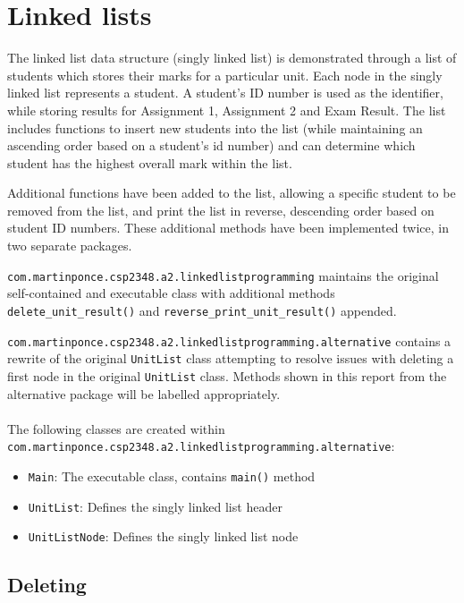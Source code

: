 \newpage
\section{Linked lists}

The linked list data structure (singly linked list) is demonstrated through a list of students which stores their marks for a particular unit. Each node in the singly linked list represents a student. A student's ID number is used as the identifier, while storing results for Assignment 1, Assignment 2 and Exam Result. The list includes functions to insert new students into the list (while maintaining an ascending order based on a student's id number) and can determine which student has the highest overall mark within the list.

Additional functions have been added to the list, allowing a specific student to be removed from the list, and print the list in reverse, descending order based on student ID numbers. These additional methods have been implemented twice, in two separate packages.

\texttt{com.martinponce.csp2348.a2.linkedlistprogramming} maintains the original self-contained and executable class with additional methods \texttt{delete_unit_result()} and \texttt{reverse_print_unit_result()} appended.

\texttt{com.martinponce.csp2348.a2.linkedlistprogramming.alternative} contains a rewrite of the original \texttt{UnitList} class attempting to resolve issues with deleting a first node in the original \texttt{UnitList} class. Methods shown in this report from the alternative package will be labelled appropriately.
\\
\\
The following classes are created within \\
\texttt{com.martinponce.csp2348.a2.linkedlistprogramming.alternative}:

\begin{itemize}
\item \texttt{Main}: The executable class, contains \texttt{main()} method
\item \texttt{UnitList}: Defines the singly linked list header
\item \texttt{UnitListNode}: Defines the singly linked list node
\end{itemize}

\newpage
\subsection{Deleting}

